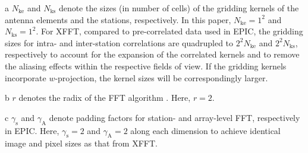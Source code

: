 \documentclass[
  journal=pasa,
  manuscript=article-type,
  year=2020,
  volume=37,
]{cup-journal}
\begin{document}
\begin{table}[htb!]
\begin{threeparttable}
\begin{tablenotes}[hang]
\item[a]$N_\textrm{ke}$ and $N_\textrm{ks}$ denote the sizes (in number of cells) of the gridding kernels of the antenna elements and the stations, respectively. In this paper, $N_\textrm{ke}=1^2$ and $N_\textrm{ks}=1^2$. For XFFT, compared to pre-correlated data used in EPIC, the gridding sizes for intra- and inter-station correlations are quadrupled to $2^2 N_\textrm{ke}$ and $2^2 N_\textrm{ks}$, respectively to account for the expansion of the correlated kernels and to remove the aliasing effects within the respective fields of view. If the gridding kernels incorporate $w$-projection, the kernel sizes will be correspondingly larger.
\item[b]$r$ denotes the radix of the FFT algorithm \citep{Cooley+Tukey1965}. Here, $r=2$. 
\item[c]$\gamma_\textrm{s}$ and $\gamma_\textrm{A}$ denote padding factors for station- and array-level FFT, respectively in EPIC. Here, $\gamma_\textrm{s}=2$ and $\gamma_\textrm{A}=2$ along each dimension to achieve identical image and pixel sizes as that from XFFT.
\end{tablenotes}
\end{threeparttable}
\end{table}


\end{document}
